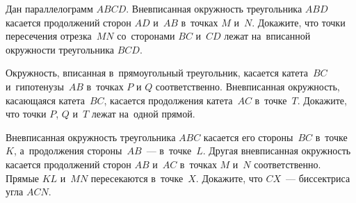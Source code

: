 \begin{problems}
\item
Дан параллелограмм $ABCD$.
Вневписанная окружность треугольника $ABD$ касается продолжений сторон $AD$
и~$AB$ в~точках $M$ и~$N$.
Докажите, что точки пересечения отрезка~$MN$ со~сторонами $BC$ и~$CD$ лежат
на~вписанной окружности треугольника $BCD$.

\item
Окружность, вписанная в~прямоугольный треугольник, касается катета~$BC$
и~гипотенузы~$AB$ в~точках $P$ и $Q$ соответственно.
Вневписанная окружность, касающаяся катета~$BC$, касается продолжения
катета~$AC$ в~точке~$T$.
Докажите, что точки $P$, $Q$ и~$T$ лежат на~одной прямой.

\item
Вневписанная окружность треугольника $ABC$ касается его стороны~$BC$
в~точке~$K$, а~продолжения стороны~$AB$~--- в~точке~$L$.
Другая вневписанная окружность касается продолжений сторон $AB$ и~$AC$
в~точках $M$ и~$N$ соответственно.
Прямые $KL$ и~$MN$ пересекаются в~точке~$X$.
Докажите, что $CX$~--- биссектриса угла $ACN$.

\end{problems}


